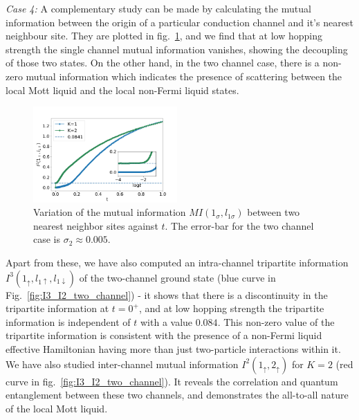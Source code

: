 \documentclass[reprint,prb,superscriptaddress]{revtex4-2}
\begin{document}
\par \textit{Case 4:} A complementary study can be made by calculating the mutual information between the origin of a particular conduction channel and it's nearest neighbour site. They are plotted in fig.~\ref{fig:MI_l_l1}, and we find that at low hopping strength the single channel mutual information vanishes, showing the decoupling of those two states. On the other hand, in the two channel case, there is a non-zero mutual information which indicates the presence of scattering between the local Mott liquid and the local non-Fermi liquid states.

\begin{figure}[!htpb]
\includegraphics[width=0.49\textwidth]{AI2ch121l1}
\caption{Variation of the mutual information $MI(1_{\sigma},l_{1\sigma})$ between two nearest neighbor sites against \(t\). The error-bar for the two channel case is $\sigma_2\approx 0.005$.}
\label{fig:MI_l_l1}
\end{figure}

Apart from these, we have also computed an intra-channel tripartite information $I^3(1_{\uparrow},l_{1\uparrow},l_{1\downarrow})$ of the two-channel ground state (blue curve in Fig.~\ref{fig:I3_I2_two_channel}) - it shows that there is a discontinuity in the tripartite information at $t=0^+$, and at low hopping strength the tripartite information is independent of $t$ with a value $0.084$. This non-zero value of the tripartite information is consistent with the presence of a non-Fermi liquid effective Hamiltonian having more than just two-particle interactions within it. We have also studied inter-channel mutual information $I^2(1_{\uparrow},2_{\uparrow})$ for \(K=2\) (red curve in fig.~\ref{fig:I3_I2_two_channel}). It reveals the correlation and quantum entanglement between these two channels, and demonstrates the all-to-all nature of the local Mott liquid.
\end{document}
